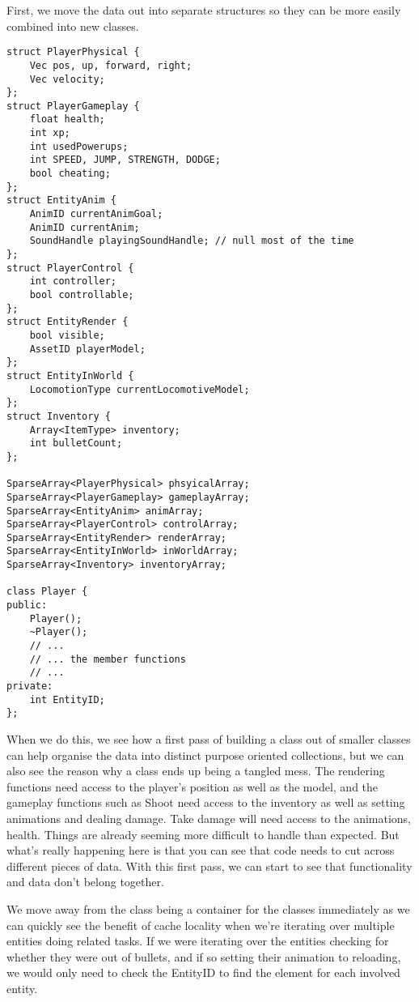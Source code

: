 First, we move the data out into separate structures so they can be more easily
combined into new classes.

\begin{lstlisting}
struct PlayerPhysical {
	Vec pos, up, forward, right;
	Vec velocity;
};
struct PlayerGameplay {
	float health;
	int xp;
	int usedPowerups;
	int SPEED, JUMP, STRENGTH, DODGE;
	bool cheating;
};
struct EntityAnim {
	AnimID currentAnimGoal;
	AnimID currentAnim;
	SoundHandle playingSoundHandle; // null most of the time
};
struct PlayerControl {
	int controller;
	bool controllable;
};
struct EntityRender {
	bool visible;
	AssetID playerModel;
};
struct EntityInWorld {
	LocomotionType currentLocomotiveModel;
};
struct Inventory {
	Array<ItemType> inventory;
	int bulletCount;
};

SparseArray<PlayerPhysical> phsyicalArray;
SparseArray<PlayerGameplay> gameplayArray;
SparseArray<EntityAnim> animArray;
SparseArray<PlayerControl> controlArray;
SparseArray<EntityRender> renderArray;
SparseArray<EntityInWorld> inWorldArray;
SparseArray<Inventory> inventoryArray;

class Player {
public:
	Player();
	~Player();
	// ...
	// ... the member functions
	// ...
private:
	int EntityID;
};
\end{lstlisting}

When we do this, we see how a first pass of building a class out of smaller
classes can help organise the data into distinct purpose oriented collections,
but we can also see the reason why a class ends up being a tangled mess. The
rendering functions need access to the player's position as well as the model,
and the gameplay functions such as Shoot need access to the inventory as well
as setting animations and dealing damage. Take damage will need access to the
animations, health. Things are already seeming more difficult to handle than
expected. But what's really happening here is that you can see that code needs
to cut across different pieces of data. With this first pass, we can start to
see that functionality and data don't belong together.

We move away from the class being a container for the classes immediately as we
can quickly see the benefit of cache locality when we're iterating over
multiple entities doing related tasks. If we were iterating over the entities
checking for whether they were out of bullets, and if so setting their
animation to reloading, we would only need to check the EntityID to find the
element for each involved entity.

